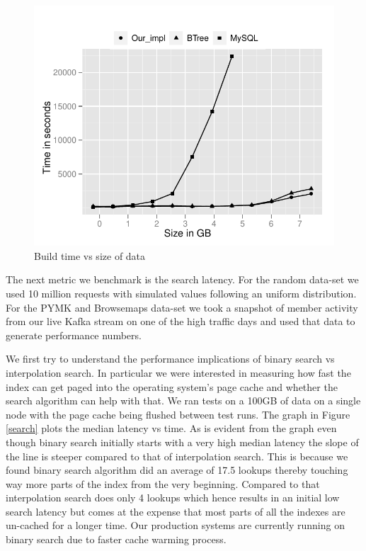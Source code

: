 \begin{figure}
  \centering
    \includegraphics[scale=0.55]{images/build.pdf}
  \caption{Build time vs size of data}
  \label{build}
\end{figure}

The next metric we benchmark is the search latency. For the random data-set we used 10 million requests with simulated values following an uniform distribution. For the PYMK and Browsemaps data-set we took a snapshot of member activity from our live Kafka stream on one of the high traffic days and used that data to generate performance numbers.

We first try to understand the performance implications of binary search vs interpolation search. In particular we were interested in measuring how fast the index can get paged into the operating system's page cache and whether the search algorithm can help with that. We ran tests on a 100GB of data on a single node with the page cache being flushed between test runs. The graph in Figure \ref{search} plots the median latency vs time. As is evident from the graph even though binary search initially starts with a very high median latency the slope of the line is steeper compared to that of interpolation search. This is because we found binary search algorithm did an average of 17.5 lookups thereby touching way more parts of the index from the very beginning. Compared to that interpolation search does only 4 lookups which hence results in an initial low search latency but comes at the expense that most parts of all the indexes are un-cached for a longer time. Our production systems are currently running on binary search due to faster cache warming process.  

